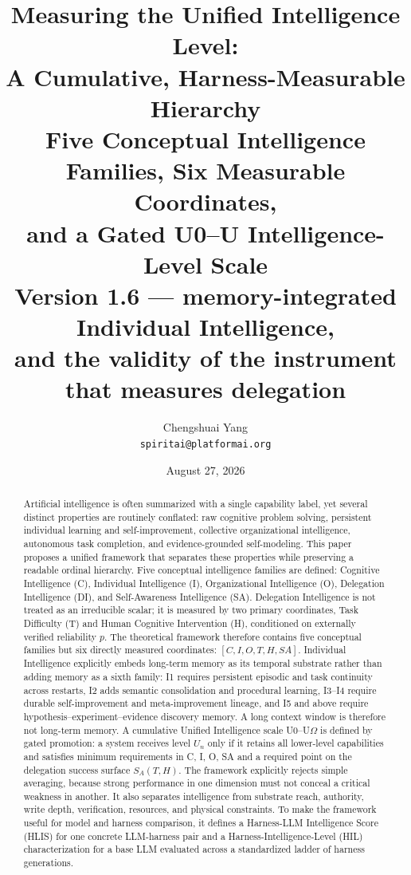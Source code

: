 \documentclass[11pt]{article}
\title{\LARGE Measuring the Unified Intelligence Level:\\[6pt]
A Cumulative, Harness-Measurable Hierarchy\\[8pt]
\large Five Conceptual Intelligence Families, Six Measurable Coordinates,\\
and a Gated U0--U\Om{} Intelligence-Level Scale\\[10pt]
\normalsize Version 1.6 --- memory-integrated Individual Intelligence,\\
and the validity of the instrument that measures delegation}
\author{Chengshuai Yang\\
\small\texttt{spiritai@platformai.org}}
\date{August 27, 2026}
\theoremstyle{definition}
\newcommand{\Om}{\ensuremath{\Omega}}
\newcommand{\SA}{\ensuremath{S_A(T,H)}}
\begin{document}
\maketitle

\begin{abstract}
Artificial intelligence is often summarized with a single capability label, yet several distinct properties are routinely conflated: raw cognitive problem solving, persistent individual learning and self-improvement, collective organizational intelligence, autonomous task completion, and evidence-grounded self-modeling. This paper proposes a unified framework that separates these properties while preserving a readable ordinal hierarchy. Five conceptual intelligence families are defined: Cognitive Intelligence (C), Individual Intelligence (I), Organizational Intelligence (O), Delegation Intelligence (DI), and Self-Awareness Intelligence (SA). Delegation Intelligence is not treated as an irreducible scalar; it is measured by two primary coordinates, Task Difficulty (T) and Human Cognitive Intervention (H), conditioned on externally verified reliability $p$. The theoretical framework therefore contains five conceptual families but six directly measured coordinates: $[C, I, O, T, H, SA]$. Individual Intelligence explicitly embeds long-term memory as its temporal substrate rather than adding memory as a sixth family: I1 requires persistent episodic and task continuity across restarts, I2 adds semantic consolidation and procedural learning, I3--I4 require durable self-improvement and meta-improvement lineage, and I5 and above require hypothesis--experiment--evidence discovery memory. A long context window is therefore not long-term memory. A cumulative Unified Intelligence scale U0--U\Om{} is defined by gated promotion: a system receives level $U_n$ only if it retains all lower-level capabilities and satisfies minimum requirements in C, I, O, SA and a required point on the delegation success surface \SA{}. The framework explicitly rejects simple averaging, because strong performance in one dimension must not conceal a critical weakness in another. It also separates intelligence from substrate reach, authority, write depth, verification, resources, and physical constraints. To make the framework useful for model and harness comparison, it defines a Harness-LLM Intelligence Score (HLIS) for one concrete LLM-harness pair and a Harness-Intelligence-Level (HIL) characterization for a base LLM evaluated across a standardized ladder of harness generations.


\end{abstract}
\end{document}
